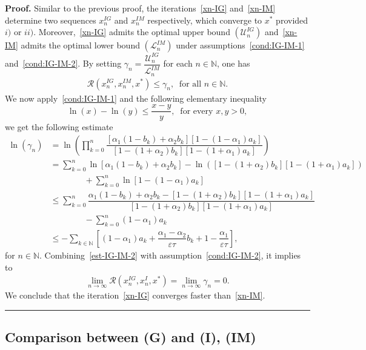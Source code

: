 \documentclass[a4paper, 11pt]{article}
\newenvironment{proof}[1][Proof]{\textbf{#1.} }{\hfill\rule{0.5em}{0.5em}}
\begin{document}
\begin{proof}
Similar to the previous proof, the iterations~\eqref{xn-IG} and~\eqref{xn-IM} determine two sequences $x_n^{IG}$ and $x_n^{IM}$ respectively, which converge to $x^*$ provided $i)$ or $ii)$. Moreover,~\eqref{xn-IG} admits the optimal upper bound $\left(\mathcal{U}^{IG}_n\right)$ and~\eqref{xn-IM} admits the optimal lower bound $\left(\mathcal{L}^{IM}_n\right)$ under assumptions~\eqref{cond:IG-IM-1} and~\eqref{cond:IG-IM-2}. By setting $\gamma_n=\displaystyle\dfrac{\mathcal{U}_n^{IG}}{\mathcal{L}_n^{IM}}$ for each  $n \in \mathbb{N}$, one has  
\begin{align}\label{est-IG-IM-2}
\mathcal{R}(x_n^{IG},x_n^{IM},x^*) \le \gamma_n,\ \mbox{ for all } n \in \mathbb{N}.
\end{align}
We now apply~\eqref{cond:IG-IM-1} and the following elementary inequality 
$$\ln(x)-\ln(y) \le \dfrac{x-y}{y}, \ \mbox{ for every } x,y >0,$$ 
we get the following estimate
\begin{align*}
	\ln(\gamma_n) &=\ln\left(\displaystyle\prod_{k=0}^n {\dfrac{[\alpha_1(1-b_k)+\alpha_2b_k][1-(1-\alpha_1)a_k]}{[1-(1+\alpha_2)b_k][1-(1+\alpha_1)a_k]}}\right) \\
	&=\displaystyle\sum_{k=0}^{n}{\ln[\alpha_1(1-b_k)+\alpha_2b_k]-\ln\left([1-(1+\alpha_2)b_k][1-(1+\alpha_1)a_k]\right)} \\
	& \qquad \qquad +\displaystyle\sum_{k=0}^{n}{\ln[1-(1-\alpha_1)a_k]} \\
	&\le\displaystyle\sum_{k=0}^{n}{\dfrac{\alpha_1(1-b_k)+\alpha_2b_k-[1-(1+\alpha_2)b_k][1-(1+\alpha_1)a_k]}{[1-(1+\alpha_2)b_k][1-(1+\alpha_1)a_k]}} \\
	& \qquad \qquad -\displaystyle\sum_{k=0}^{n}{(1-\alpha_1)a_k} \\
	&\le -\displaystyle\sum_{k \in \mathbb{N}}{\left[(1-\alpha_1)a_k+\dfrac{\alpha_1-\alpha_2}{\varepsilon\tau}b_k+1-\displaystyle\dfrac{\alpha_1}{\varepsilon\tau}\right]},
\end{align*}
for $n \in \mathbb{N}$. Combining~\eqref{est-IG-IM-2} with assumption~\eqref{cond:IG-IM-2}, it implies to 
\begin{align*}
\lim\limits_{n\to\infty} \mathcal{R}(x_n^{IG},x_n^{I},x^*) =  \lim\limits_{n\to\infty}{\gamma_n} = 0.
\end{align*}
We conclude that the iteration~\eqref{xn-IG} converges faster than~\eqref{xn-IM}.
\end{proof}

\subsection{Comparison between (G) and (I), (IM)}
\end{document}
